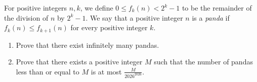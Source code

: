 For positive integers $n,k$, we define $0 \le f_k(n) < 2^{k}-1$ to be
the remainder of the division of $n$ by $2^k-1$.
We say that a positive integer $n$ is a \emph{panda} if
$f_k(n) \le f_{k+1}(n)$ for every positive integer $k$.
\begin{enumerate}
    \item[a)] Prove that there exist infinitely many pandas.
    \item[b)] Prove that there exists a positive integer $M$
    such that the number of pandas less than or equal to $M$ is at most $\frac{M}{2026^{2026}}$.
\end{enumerate}
